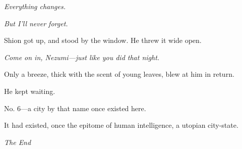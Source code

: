 \emph{Everything changes.}

\emph{But I'll never forget.}

Shion got up, and stood by the window. He threw it wide open.

\emph{Come on in, Nezumi---just like you did that night.}

Only a breeze, thick with the scent of young leaves, blew at him in
return.

He kept waiting.

\myspace

No. 6---a city by that name once existed here.

It had existed, once the epitome of human intelligence, a utopian
city-state.

\myspace

\begin{center}
	\sffamily
	\emph{The End}
\end{center}